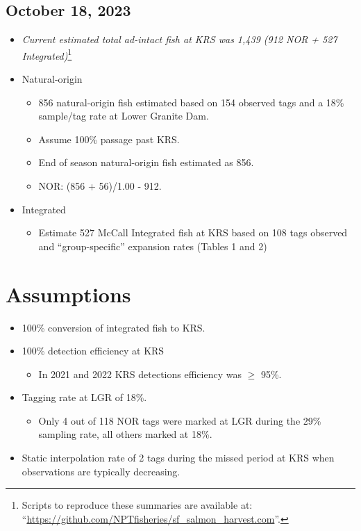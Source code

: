 \documentclass[11pt,a4paper,]{article}
\providecommand{\tightlist}{%
  \setlength{\itemsep}{0pt}\setlength{\parskip}{0pt}}
\begin{document}
\hypertarget{october-18-2023}{%
\subsection{October 18, 2023}\label{october-18-2023}}

\begin{itemize}
\tightlist
\item
  \emph{Current estimated total ad-intact fish at KRS was 1,439 (912 NOR + 527 Integrated)}\footnote{Scripts to reproduce these summaries are available at: ``\url{https://github.com/NPTfisheries/sf_salmon_harvest.com}''.}
\item
  Natural-origin

  \begin{itemize}
  \tightlist
  \item
    856 natural-origin fish estimated based on 154 observed tags and a 18\% sample/tag rate at Lower Granite Dam.
  \item
    Assume 100\% passage past KRS.
  \item
    End of season natural-origin fish estimated as 856.
  \item
    NOR: (856 + 56)/1.00 - 912.
  \end{itemize}
\item
  Integrated

  \begin{itemize}
  \tightlist
  \item
    Estimate 527 McCall Integrated fish at KRS based on 108 tags observed and ``group-specific'' expansion rates (Tables 1 and 2)
  \end{itemize}
\end{itemize}

\hypertarget{assumptions}{%
\section{Assumptions}\label{assumptions}}

\begin{itemize}
\tightlist
\item
  100\% conversion of integrated fish to KRS.
\item
  100\% detection efficiency at KRS

  \begin{itemize}
  \tightlist
  \item
    In 2021 and 2022 KRS detections efficiency was \(\ge\) 95\%.
  \end{itemize}
\item
  Tagging rate at LGR of 18\%.

  \begin{itemize}
  \tightlist
  \item
    Only 4 out of 118 NOR tags were marked at LGR during the 29\% sampling rate, all others marked at 18\%.
  \end{itemize}
\item
  Static interpolation rate of 2 tags during the missed period at KRS when observations are typically decreasing.
\end{itemize}
\end{document}
